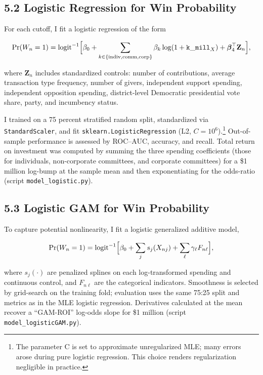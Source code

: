 \subsection*{5.2 Logistic Regression for Win Probability}

For each cutoff, I fit a logistic regression of the form

\[ \Pr (W_n = 1) = \operatorname{logit}^{-1} \Bigl[ \beta_0 + \sum_{k \in \{\mathrm{indiv}, \mathrm{comm}, \mathrm{corp}\}} \beta_k \log(1 + \mathtt{k\_mill}_X) + \boldsymbol{\beta}_4^\top \mathbf{Z}_n \Bigr], \]

\noindent where $\mathbf{Z}_n$ includes standardized controls: number of contributions, average transaction type frequency, number of givers, independent support spending, independent opposition spending, district-level Democratic presidential vote share, party, and incumbency status.

\indent I trained on a 75 percent stratified random split, standardized via \texttt{StandardScaler}, and fit \texttt{sklearn.LogisticRegression} (L2, $C = 10^6$).\footnote{The parameter C is set to approximate unregularized MLE; many errors arose during pure logistic regression. This choice renders regularization negligible in practice.} Out-of-sample performance is assessed by ROC--AUC, accuracy, and recall. Total return on investment was computed by summing the three spending coefficients (those for individuals, non-corporate committees, and corporate committees) for a \$1 million log-bump at the sample mean and then exponentiating for the odds-ratio (script \texttt{model\_logistic.py}).

\subsection*{5.3 Logistic GAM for Win Probability}

To capture potential nonlinearity, I fit a logistic generalized additive model,

\[ \Pr (W_n = 1 ) = \operatorname{logit}^{-1} \Bigl[\beta_0 + \sum_{j} s_j (X_{nj}) + \sum_{\ell} \gamma_\ell F_{n \ell} \Bigr], \] 

\noindent where $s_j (\cdot)$ are penalized splines on each log-transformed spending and continuous control, and $F_{n \ell}$ are the categorical indicators. Smoothness is selected by grid-search on the training fold; evaluation uses the same 75:25 split and metrics as in the MLE logistic regression. Derivatives calculated at the mean recover a ``GAM-ROI'' log-odds slope for \$1 million (script \texttt{model\_logisticGAM.py}). 

